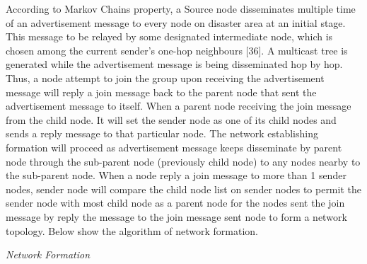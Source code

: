 \documentclass{article}
\begin{document}
According to Markov Chains property, a Source node disseminates multiple time of an advertisement message to every node on disaster area at an initial stage. This message to be relayed by some designated intermediate node, which is chosen among the current sender's one-hop neighbours [36]. A multicast tree is generated while the advertisement message is being disseminated hop by hop. Thus, a node attempt to join the group upon receiving the advertisement message will reply a join message back to the parent node that sent the advertisement message to itself. When a parent node receiving the join message from the child node. It will set the sender node as one of its child nodes and sends a reply message to that particular node. The network establishing formation will proceed as advertisement message keeps disseminate by parent node through the sub-parent node (previously child node) to any nodes nearby to the sub-parent node. When a node reply a join message to more than 1 sender nodes, sender node will compare the child node list on sender nodes to permit the sender node with most child node as a parent node for the nodes sent the join message by reply the message to the join message sent node to form a network topology. Below show the algorithm of network formation.

\newpage

\begin{algorithm}
\caption{ \emph{Network Formation}}
\label{algo:first}
\end{algorithm}
\end{document}
